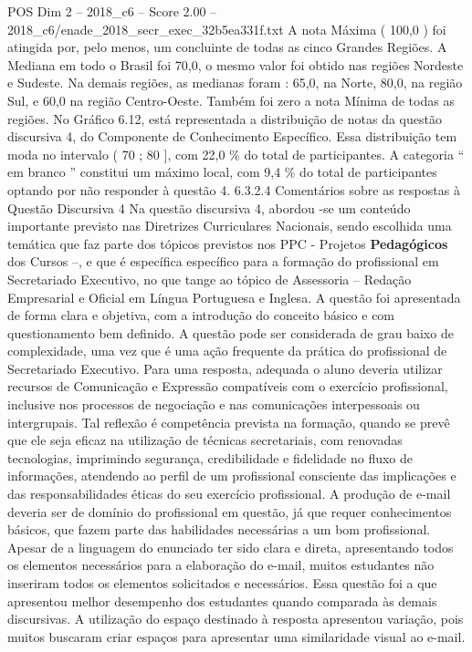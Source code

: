 \begin{textsample}{POS Dim 2 – 2018\_c6 – Score 2.00 – 2018\_c6/enade\_2018\_secr\_exec\_32b5ea331f.txt}
A nota Máxima ( 100,0 ) foi atingida por, pelo menos, um concluinte de todas as cinco Grandes Regiões.
A Mediana em todo o Brasil foi 70,0, o mesmo valor foi obtido nas regiões Nordeste e Sudeste.
Na demais regiões, as medianas foram : 65,0, na Norte, 80,0, na região Sul, e 60,0 na região Centro-Oeste.
Também foi zero a nota Mínima de todas as regiões.
No Gráfico 6.12, está representada a distribuição de notas da questão discursiva 4, do Componente de Conhecimento Específico.
Essa distribuição tem moda no intervalo ( 70 ; 80 ], com 22,0 \% do total de participantes.
A categoria “ em branco ” constitui um máximo local, com 9,4 \% do total de participantes optando por não responder à questão 4. 6.3.2.4 Comentários sobre as respostas à Questão Discursiva 4 Na questão discursiva 4, abordou -se um conteúdo importante previsto nas Diretrizes Curriculares Nacionais, sendo escolhida uma temática que faz parte dos tópicos previstos nos PPC - Projetos \textbf{Pedagógicos} dos Cursos –, e que é específica específico para a formação do profissional em Secretariado Executivo, no que tange ao tópico de Assessoria – Redação Empresarial e Oficial em Língua Portuguesa e Inglesa.
A questão foi apresentada de forma clara e objetiva, com a introdução do conceito básico e com questionamento bem definido.
A questão pode ser considerada de grau baixo de complexidade, uma vez que é uma ação frequente da prática do profissional de Secretariado Executivo.
Para uma resposta, adequada o aluno deveria utilizar recursos de Comunicação e Expressão compatíveis com o exercício profissional, inclusive nos processos de negociação e nas comunicações interpessoais ou intergrupais.
Tal reflexão é competência prevista na formação, quando se prevê que ele seja eficaz na utilização de técnicas secretariais, com renovadas tecnologias, imprimindo segurança, credibilidade e fidelidade no fluxo de informações, atendendo ao perfil de um profissional consciente das implicações e das responsabilidades éticas do seu exercício profissional.
A produção de e-mail deveria ser de domínio do profissional em questão, já que requer conhecimentos básicos, que fazem parte das habilidades necessárias a um bom profissional.
Apesar de a linguagem do enunciado ter sido clara e direta, apresentando todos os elementos necessários para a elaboração do e-mail, muitos estudantes não inseriram todos os elementos solicitados e necessários.
Essa questão foi a que apresentou melhor desempenho dos estudantes quando comparada às demais discursivas.
A utilização do espaço destinado à resposta apresentou variação, pois muitos buscaram criar espaços para apresentar uma similaridade visual ao e-mail.

\end{textsample}
